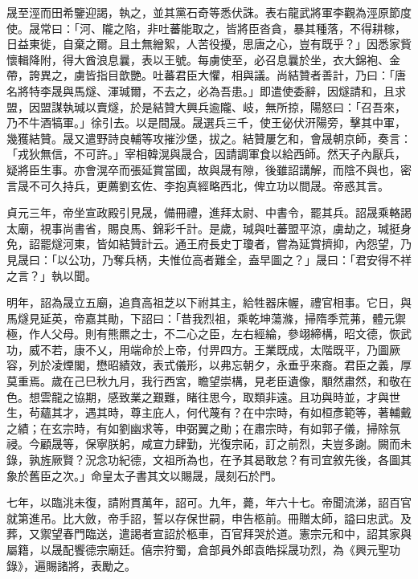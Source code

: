 \begin{pinyinscope}
 晟至涇而田希鑒迎謁，執之，並其黨石奇等悉伏誅。表右龍武將軍李觀為涇原節度使。晟常曰：「河、隴之陷，非吐蕃能取之，皆將臣沓貪，暴其種落，不得耕稼，日益東徙，自棄之爾。且土無繒絮，人苦役擾，思唐之心，豈有既乎？」因悉家貲懷輯降附，得大酋浪息曩，表以王號。每虜使至，必召息曩於坐，衣大錦袍、金帶，誇異之，虜皆指目歆艷。吐蕃君臣大懼，相與議。尚結贊者善計，乃曰：「唐名將特李晟與馬燧、渾瑊爾，不去之，必為吾患。」即遣使委辭，因燧請和，且求盟，因盟謀執瑊以賣燧，於是結贊大興兵逾隴、岐，無所掠，陽怒曰：「召吾來，乃不牛酒犒軍。」徐引去。以是間晟。晟選兵三千，使王佖伏汧陽旁，擊其中軍，幾獲結贊。晟又遣野詩良輔等攻摧沙堡，拔之。結贊屢乞和，會晟朝京師，奏言：「戎狄無信，不可許。」宰相韓滉與晟合，因請調軍食以給西師。然天子內厭兵，疑將臣生事。亦會滉卒而張延賞當國，故與晟有隙，後雖詔講解，而陰不與也，密言晟不可久持兵，更薦劉玄佐、李抱真經略西北，俾立功以間晟。帝惑其言。



 貞元三年，帝坐宣政殿引見晟，備冊禮，進拜太尉、中書令，罷其兵。詔晟乘輅謁太廟，視事尚書省，賜良馬、錦彩千計。是歲，瑊與吐蕃盟平涼，虜劫之，瑊挺身免，詔罷燧河東，皆如結贊計云。通王府長史丁瓊者，嘗為延賞擠抑，內怨望，乃見晟曰：「以公功，乃奪兵柄，夫惟位高者難全，盍早圖之？」晟曰：「君安得不祥之言？」執以聞。



 明年，詔為晟立五廟，追賁高祖芝以下祔其主，給牲器床幄，禮官相事。它日，與馬燧見延英，帝嘉其勛，下詔曰：「昔我烈祖，乘乾坤蕩滌，掃隋季荒茀，體元禦極，作人父母。則有熊羆之士，不二心之臣，左右經綸，參翊締構，昭文德，恢武功，威不若，康不乂，用端命於上帝，付畀四方。王業既成，太階既平，乃圖厥容，列於凌煙閣，懋昭績效，表式儀形，以弗忘朝夕，永垂乎來裔。君臣之義，厚莫重焉。歲在己巳秋九月，我行西宮，瞻望崇構，見老臣遺像，顒然肅然，和敬在色。想雲龍之協期，感致業之艱難，睹往思今，取類非遠。且功與時並，才與世生，茍蘊其才，遇其時，尊主庇人，何代蔑有？在中宗時，有如桓彥範等，著輔戴之績；在玄宗時，有如劉幽求等，申弼翼之勛；在肅宗時，有如郭子儀，掃除氛祲。今顧晟等，保寧朕躬，咸宣力肆勤，光復宗祏，訂之前烈，夫豈多謝。闕而未錄，孰旌厥賢？況念功紀德，文祖所為也，在予其曷敢怠？有司宜敘先後，各圖其象於舊臣之次。」命皇太子書其文以賜晟，晟刻石於門。



 七年，以臨洮未復，請附貫萬年，詔可。九年，薨，年六十七。帝聞流涕，詔百官就第進吊。比大斂，帝手詔，誓以存保世嗣，申告柩前。冊贈太師，謚曰忠武。及葬，又禦望春門臨送，遣謁者宣詔於柩車，百官拜哭於道。憲宗元和中，詔其家與屬籍，以晟配饗德宗廟廷。僖宗狩蜀，倉部員外郎袁皓採晟功烈，為《興元聖功錄》，遍賜諸將，表勵之。




\end{pinyinscope}
